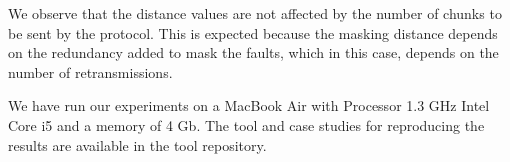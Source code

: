We observe that the distance values are not affected by the number of chunks 
to be sent by the protocol. This is expected because the masking distance depends on 
the redundancy added to mask the faults, which in this case, depends on the number of 
retransmissions.

We have run our experiments on a MacBook Air with Processor 1.3 GHz Intel Core i5 and 
a memory of 4 Gb. The tool and case studies for reproducing the results are available in the tool repository.
